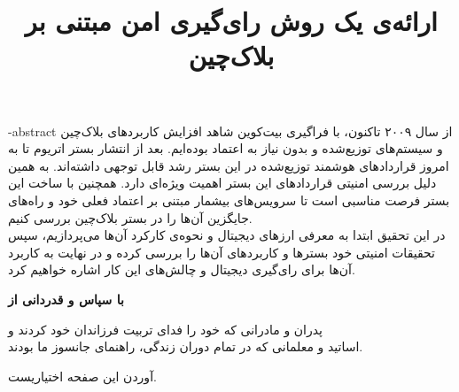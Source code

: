 \documentclass[oneside,openany,msc]{SBU-Thesis}
\begin{document}
	\title{ارائه‌ی یک روش رای‌گیری امن مبتنی بر بلاک‌چین}
	
	\subject{مهندسی کامپیوتر}
	
	
	
	
	


	
	
	
	\fa-abstract{	
		از سال ۲۰۰۹ تاکنون، با فراگیری بیت‌‌کوین شاهد افزایش ‌کاربرد‌های بلاک‌چین و سیستم‌های توزیع‌شده و بدون نیاز به اعتماد بوده‌ایم. بعد از انتشار بستر اتریوم تا به امروز قرار‌داد‌های هوشمند توزیع‌شده در این بستر رشد قابل توجهی داشته‌اند. به همین دلیل بررسی امنیتی قرار‌داد‌های این بستر اهمیت ویژه‌ای دارد. همچنین با ساخت این بستر فرصت مناسبی است تا سرویس‌های بیشمار مبتنی بر اعتماد فعلی خود و راه‌های جایگزین آن‌ها را در بستر بلاک‌چین بررسی کنیم.
		\\
		در این تحقیق ابتدا به معرفی ارز‌های دیجیتال و نحوه‌ی کارکرد آن‌ها می‌پردازیم، سپس تحقیقات امنیتی خود بسترها و کاربرد‌های آن‌ها را بررسی کرده و در نهایت به کاربرد آن‌ها برای رای‌گیری دیجیتال و چالش‌های این کار اشاره خواهیم کرد. 
	}
	
\firstPage %
\davaranPage %

{
	\newpage
	\thispagestyle{plain}
	\noindent
	\large{\textbf{با سپاس و قدردانی از}}
	
	\noindent
	پدران و مادرانی که خود را فدای تربیت فرزاندان خود کردند و\\
	اساتید و معلمانی که در تمام دوران زندگی، راهنمای جانسوز ما بودند.
	
	
	\vspace{14cm}	
	آوردن این صفحه اختیاریست.
	
	\pagebreak
}
\end{document}
